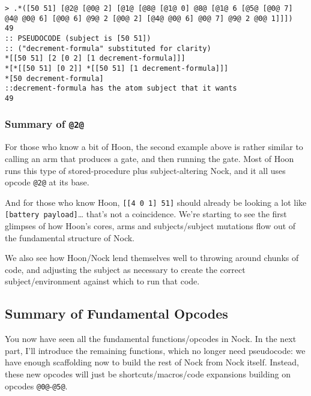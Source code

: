 \documentclass[twoside]{article}
\begin{document}
\begin{lstlisting}[style=listingcode]
> .*([50 51] [@2@ [@0@ 2] [@1@ [@8@ [@1@ 0] @8@ [@1@ 6 [@5@ [@0@ 7] @4@ @0@ 6] [@0@ 6] @9@ 2 [@0@ 2] [@4@ @0@ 6] @0@ 7] @9@ 2 @0@ 1]]])
49
:: PSEUDOCODE (subject is [50 51])
:: ("decrement-formula" substituted for clarity)
*[[50 51] [2 [0 2] [1 decrement-formula]]]
*[*[[50 51] [0 2]] *[[50 51] [1 decrement-formula]]]
*[50 decrement-formula]
::decrement-formula has the atom subject that it wants
49
\end{lstlisting}

\subsubsection{Summary of \lstinline[style=inlinecode]{@2@}}

For those who know a bit of Hoon, the second example above is rather similar to calling an arm that produces a gate, and then running the gate. Most of Hoon runs this type of stored-procedure plus subject-altering Nock, and it all uses opcode \lstinline[style=inlinecode]{@2@} at its base.

And for those who know Hoon, \lstinline[style=inlinecode]{[[4 0 1] 51]} should already be looking a lot like \lstinline[style=inlinecode]{[battery payload]}\dots{} that's not a coincidence.  We're starting to see the first glimpses of how Hoon's cores, arms and subjects/subject mutations flow out of the fundamental structure of Nock.

We also see how Hoon/Nock lend themselves well to throwing around chunks of code, and adjusting the subject as necessary to create the correct subject/environment against which to run that code.

\subsection{Summary of Fundamental Opcodes}

You now have seen all the fundamental functions/opcodes in Nock. In the next part, I'll introduce the remaining functions, which no longer need pseudocode: we have enough scaffolding now to build the rest of Nock from Nock itself. Instead, these new opcodes will just be shortcuts/macros/code expansions building on opcodes \lstinline[style=inlinecode]{@0@}-\lstinline[style=inlinecode]{@5@}.

\end{document}
